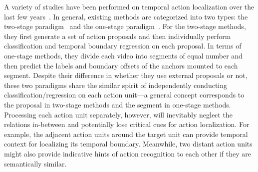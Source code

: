 \documentclass[10pt,journal,compsoc]{IEEEtran}
\def\hao{\textcolor{black}}
\begin{document}
	
	
	
	A variety of studies have been performed on temporal action localization over the last few years~\cite{chao2018rethinking,gao2017cascaded,lin2017single,shou2017cdc,shou2016temporal,buch2017end,huang2019decoupling,alwassel2018action,gleason2019proposal,zhao2017temporal}. In general, existing methods are categorized into two types: the two-stage paradigm~\cite{shou2016temporal,zhao2017temporal,chao2018rethinking,gao2017cascaded} and the one-stage paradigm~\cite{lin2017single,huang2019decoupling,buch2017end}. For the two-stage methods, they first generate a set of action proposals and then individually perform classification and temporal boundary regression on each proposal.
	In terms of one-stage methods, they divide each video into segments of equal number and then predict the labels and boundary offsets of the anchors mounted to each segment. Despite their difference in whether they use external proposals or not, these two paradigms share the similar spirit of independently conducting classification/regression on each action unit---a general concept corresponds to the proposal in two-stage methods and the segment in one-stage methods. Processing each action unit separately, however, will inevitably neglect the relations in-between and potentially lose critical cues for action localization. 
	For example, the adjacent action units around the target unit can provide temporal context for localizing its temporal boundary. Meanwhile, two distant action units might also provide indicative hints of action recognition to each other if they are semantically similar.
	
\end{document}
